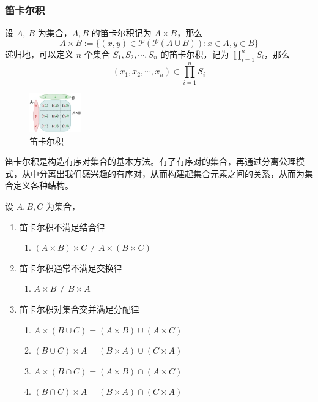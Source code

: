 \subsubsection*{笛卡尔积}

\begin{definition}
    设 $ A,\ B $ 为集合，$ A,B $ 的笛卡尔积记为 $ A\times B $，那么
    \[
        A\times B := \{(x,y)\in \mathcal{P}(\mathcal{P}(A\cup B)):x\in A,y\in B\} 
    \]
    递归地，可以定义 $n$ 个集合 $S_1,S_2,\cdots,S_n$ 的笛卡尔积，记为 $\prod^n_{i=1}S_i$，那么
    \[
        (x_1,x_2,\cdots,x_n) \in \prod^n_{i=1}S_i
    \]
\end{definition}


\begin{figure}[htbp]
    \centering
    \includegraphics[width=0.2\textwidth]{figures/chapter1/chapter1_6} 
    \caption{笛卡尔积}
    \label{fig:chapter1_6}
\end{figure}

\begin{note}
    笛卡尔积是构造有序对集合的基本方法。有了有序对的集合，再通过分离公理模式，从中分离出我们感兴趣的有序对，从而构建起集合元素之间的关系，从而为集合定义各种结构。
\end{note}

\begin{proposition}[笛卡尔积的性质]
    设 $A, B, C$ 为集合，
    \begin{enumerate}
        \item 笛卡尔积不满足结合律
        \begin{enumerate}
            \item $(A\times B)\times C \neq A\times (B\times C)$
        \end{enumerate}
        \item 笛卡尔积通常不满足交换律
        \begin{enumerate}
            \item $A\times B \neq B\times A$
        \end{enumerate}
        \item 笛卡尔积对集合交并满足分配律
        \begin{enumerate}
            \item $A \times(B \cup C)=(A \times B) \cup(A \times C)$
            \item $(B \cup C) \times A=(B \times A) \cup(C \times A)$
            \item $A \times(B \cap C)=(A \times B) \cap(A \times C) $
            \item $(B \cap C) \times A=(B \times A) \cap(C \times A)$
        \end{enumerate}
    \end{enumerate}
\end{proposition}

